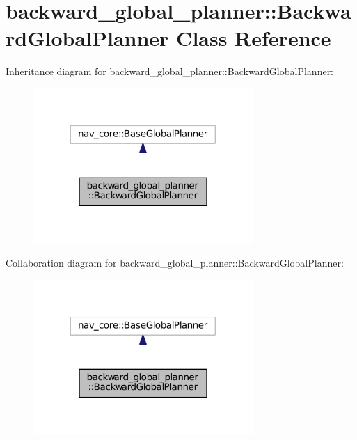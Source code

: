 \hypertarget{classbackward__global__planner_1_1BackwardGlobalPlanner}{}\section{backward\+\_\+global\+\_\+planner\+:\+:Backward\+Global\+Planner Class Reference}
\label{classbackward__global__planner_1_1BackwardGlobalPlanner}


Inheritance diagram for backward\+\_\+global\+\_\+planner\+:\+:Backward\+Global\+Planner\+:
\nopagebreak
\begin{figure}[H]
\begin{center}
\leavevmode
\includegraphics[width=236pt]{classbackward__global__planner_1_1BackwardGlobalPlanner__inherit__graph}
\end{center}
\end{figure}


Collaboration diagram for backward\+\_\+global\+\_\+planner\+:\+:Backward\+Global\+Planner\+:
\nopagebreak
\begin{figure}[H]
\begin{center}
\leavevmode
\includegraphics[width=236pt]{classbackward__global__planner_1_1BackwardGlobalPlanner__coll__graph}
\end{center}
\end{figure}
